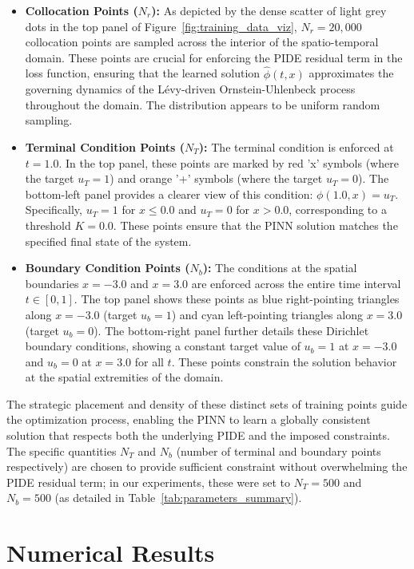 \documentclass[11pt,twoside,openright]{report}
\begin{document}
\begin{itemize}
    \item \textbf{Collocation Points ($N_r$):} As depicted by the dense scatter of light grey dots in the top panel of Figure~\ref{fig:training_data_viz}, $N_r = 20,000$ collocation points are sampled across the interior of the spatio-temporal domain. These points are crucial for enforcing the PIDE residual term in the loss function, ensuring that the learned solution $\hat{\phi}(t,x)$ approximates the governing dynamics of the Lévy-driven Ornstein-Uhlenbeck process throughout the domain. The distribution appears to be uniform random sampling.

    \item \textbf{Terminal Condition Points ($N_T$):} The terminal condition is enforced at $t=1.0$. In the top panel, these points are marked by red 'x' symbols (where the target $u_T=1$) and orange '+' symbols (where the target $u_T=0$). The bottom-left panel provides a clearer view of this condition: $\phi(1.0, x) = u_T$. Specifically, $u_T = 1$ for $x \le 0.0$ and $u_T = 0$ for $x > 0.0$, corresponding to a threshold $K=0.0$. These points ensure that the PINN solution matches the specified final state of the system.

    \item \textbf{Boundary Condition Points ($N_b$):} The conditions at the spatial boundaries $x=-3.0$ and $x=3.0$ are enforced across the entire time interval $t \in [0,1]$. The top panel shows these points as blue right-pointing triangles along $x=-3.0$ (target $u_b=1$) and cyan left-pointing triangles along $x=3.0$ (target $u_b=0$). The bottom-right panel further details these Dirichlet boundary conditions, showing a constant target value of $u_b=1$ at $x=-3.0$ and $u_b=0$ at $x=3.0$ for all $t$. These points constrain the solution behavior at the spatial extremities of the domain.
\end{itemize}

The strategic placement and density of these distinct sets of training points guide the optimization process, enabling the PINN to learn a globally consistent solution that respects both the underlying PIDE and the imposed constraints. The specific quantities $N_T$ and $N_b$ (number of terminal and boundary points respectively) are chosen to provide sufficient constraint without overwhelming the PIDE residual term; in our experiments, these were set to $N_T=500$ and $N_b=500$ (as detailed in Table~\ref{tab:parameters_summary}).

\section{Numerical Results} %
\end{document}
